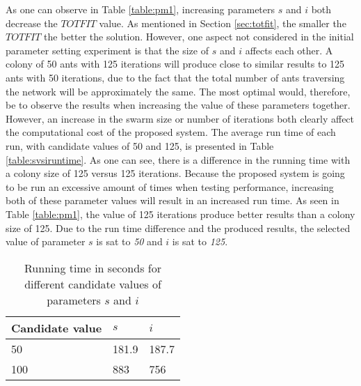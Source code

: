 As one can observe in Table \vref{table:pm1}, increasing parameters $s$ and $i$ both decrease the $TOTFIT$ value. As mentioned in Section \vref{sec:totfit}, the smaller the $TOTFIT$ the better the solution. However, one aspect not considered in the initial parameter setting experiment is that the size of $s$ and $i$ affects each other. A colony of 50 ants with 125 iterations will produce close to similar results to 125 ants with 50 iterations, due to the fact that the total number of ants traversing the network will be approximately the same. The most optimal would, therefore, be to observe the results when increasing the value of these parameters together. However, an increase in the swarm size or number of iterations both clearly affect the computational cost of the proposed system. The average run time of each run, with candidate values of 50 and 125, is presented in Table \vref{table:svsiruntime}. As one can see, there is a difference in the running time with a colony size of 125 versus 125 iterations. Because the proposed system is going to be run an excessive amount of times when testing performance, increasing both of these parameter values will result in an increased run time. As seen in Table \ref{table:pm1}, the value of 125 iterations produce better results than a colony size of 125. Due to the run time difference and the produced results, the selected value of parameter $s$ is sat to \textit{50} and $i$ is sat to \textit{125}.

\begin{table}[H]
    \centering
    \begin{tabular}{|l|l|l|}
    \hline
    \textbf{Candidate value} & \textbf{$s$} & \textbf{$i$}\\
    \hline
    50 & 181.9 & 187.7 \\
    100 & 883 & 756\\
    \hline
    \end{tabular}
    \caption {Running time in seconds for different candidate values of parameters $s$ and $i$}
    \label{table:svsiruntime}
    \end{table}


